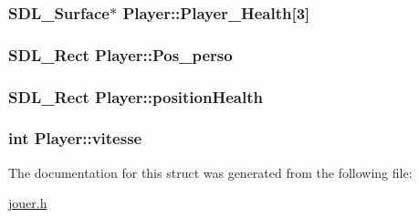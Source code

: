 \subsubsection[{\texorpdfstring{Player\+\_\+\+Health}{Player_Health}}]{\setlength{\rightskip}{0pt plus 5cm}S\+D\+L\+\_\+\+Surface$\ast$ Player\+::\+Player\+\_\+\+Health\mbox{[}3\mbox{]}}\hypertarget{structPlayer_a8546b278600e85d8282c844e6d9b55a9}{}\label{structPlayer_a8546b278600e85d8282c844e6d9b55a9}
\subsubsection[{\texorpdfstring{Pos\+\_\+perso}{Pos_perso}}]{\setlength{\rightskip}{0pt plus 5cm}S\+D\+L\+\_\+\+Rect Player\+::\+Pos\+\_\+perso}\hypertarget{structPlayer_ad53069059454d7d755241d247ef53215}{}\label{structPlayer_ad53069059454d7d755241d247ef53215}
\subsubsection[{\texorpdfstring{position\+Health}{positionHealth}}]{\setlength{\rightskip}{0pt plus 5cm}S\+D\+L\+\_\+\+Rect Player\+::position\+Health}\hypertarget{structPlayer_a1bacd571de4e88c588acc680d35a1951}{}\label{structPlayer_a1bacd571de4e88c588acc680d35a1951}
\subsubsection[{\texorpdfstring{vitesse}{vitesse}}]{\setlength{\rightskip}{0pt plus 5cm}int Player\+::vitesse}\hypertarget{structPlayer_a42ac1807ed94d9075f828ddcb0d4adc8}{}\label{structPlayer_a42ac1807ed94d9075f828ddcb0d4adc8}


The documentation for this struct was generated from the following file\+:\begin{DoxyCompactItemize}
\item 
\hyperlink{jouer_8h}{jouer.\+h}\end{DoxyCompactItemize}
